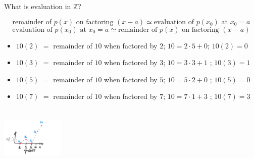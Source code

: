 \documentclass[8pt]{beamer}
\newcommand{\Z}{\mathbb Z}
\begin{document}
\begin{frame}{What is evaluation in $\Z$?}

$$\text{remainder of $p(x)$ on factoring $(x - a)$} \simeq \text{evaluation of $p(x_0)$ at $x_0 = a$}$$
\pause
$$\text{evaluation of $p(x_0)$ at $x_0 = a$} \simeq \text{remainder of $p(x)$ on factoring $(x - a)$} $$
\pause
\begin{itemize}
\item $10(2)$ \pause $ = $ remainder of $10$ when factored by $2$; \pause $10 = 2\cdot5 + 0$\pause; $10(2) = 0$ \pause
\item $10(3)$ \pause $ = $ remainder of $10$ when factored by $3$; \pause $10 = 3\cdot3 + 1$ \pause; $10(3) = 1$ \pause
\item $10(5)$ \pause $ = $ remainder of $10$ when factored by $5$; \pause $10 = 5\cdot 2 + 0$ \pause; $10(5) = 0$ \pause
\item $10(7)$ \pause $ = $ remainder of $10$ when factored by $7$; \pause $10 = 7\cdot1 + 3$ \pause; $10(7) = 3$ \pause
\end{itemize}
\pause

\includegraphics[width=3cm, height=3cm]{./10-as-a-fn.png}

\end{frame}
\end{document}
